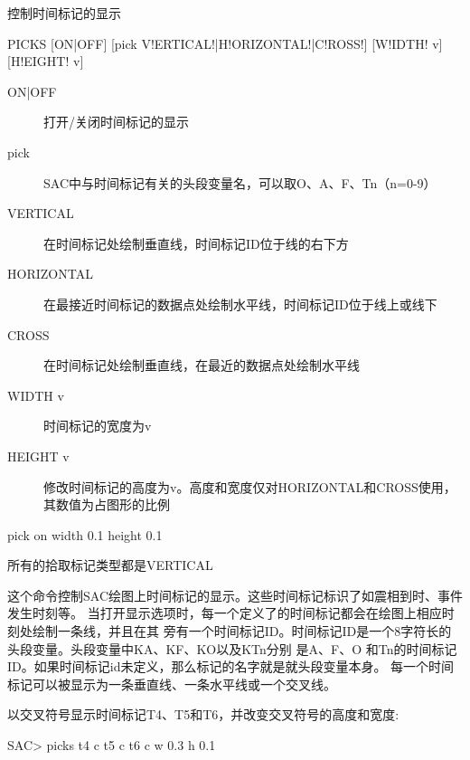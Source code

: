 \label{cmd:picks}

控制时间标记的显示

\begin{SACSTX}
PICKS [ON|OFF] [pick V!ERTICAL!|H!ORIZONTAL!|C!ROSS!] [W!IDTH! v] [H!EIGHT! v]
\end{SACSTX}

\begin{description}
\item [ON|OFF] 打开/关闭时间标记的显示
\item [pick] SAC中与时间标记有关的头段变量名，可以取O、A、F、Tn（n=0-9）
\item [VERTICAL] 在时间标记处绘制垂直线，时间标记ID位于线的右下方
\item [HORIZONTAL] 在最接近时间标记的数据点处绘制水平线，时间标记ID位于线上或线下
\item [CROSS] 在时间标记处绘制垂直线，在最近的数据点处绘制水平线
\item [WIDTH v] 时间标记的宽度为v 
\item [HEIGHT v] 修改时间标记的高度为v。高度和宽度仅对HORIZONTAL和CROSS使用，其数值为占图形的比例
\end{description}

\begin{SACDFT}
pick on width 0.1 height 0.1
\end{SACDFT}
所有的拾取标记类型都是VERTICAL

这个命令控制SAC绘图上时间标记的显示。这些时间标记标识了如震相到时、事件发生时刻等。
当打开显示选项时，每一个定义了的时间标记都会在绘图上相应时刻处绘制一条线，并且在其
旁有一个时间标记ID。时间标记ID是一个8字符长的头段变量。头段变量中KA、KF、KO以及KTn分别
是A、F、O 和Tn的时间标记ID。如果时间标记id未定义，那么标记的名字就是就头段变量本身。
每一个时间标记可以被显示为一条垂直线、一条水平线或一个交叉线。

以交叉符号显示时间标记T4、T5和T6，并改变交叉符号的高度和宽度:
\begin{SACCode}
SAC> picks t4 c t5 c t6 c w 0.3 h 0.1
\end{SACCode}
